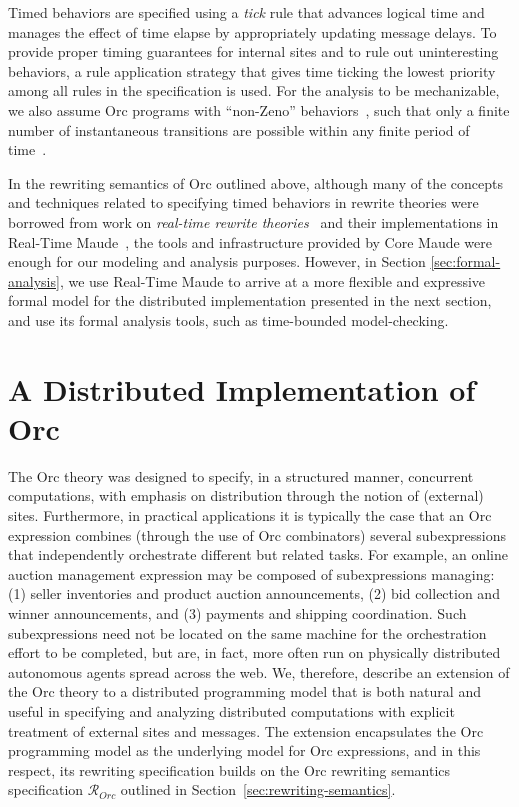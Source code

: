 \documentclass{eptcs}
\begin{document}
Timed behaviors are specified using a \emph{tick} rule that advances logical time and manages the effect of time elapse by appropriately updating message delays. To provide proper timing guarantees for internal sites and to rule out uninteresting behaviors, a rule application strategy that gives time ticking the lowest priority among all rules in the specification is used. For the analysis to be mechanizable, we also assume Orc programs with ``non-Zeno'' behaviors~\cite{OlveczkyM2007}, such that only a finite number of instantaneous transitions are possible within any finite  period of time~\cite{AlTurkiM07WWV}.
 


In the rewriting semantics of Orc outlined above, although many of the concepts and techniques related to specifying timed behaviors in rewrite theories were borrowed from work on \emph{real-time rewrite theories}~\cite{journ-rtm} and their implementations in Real-Time Maude~\cite{RTMManual07}, the tools and infrastructure provided by Core Maude were enough for our modeling and analysis purposes. However, in Section \ref{sec:formal-analysis}, we use Real-Time Maude to arrive at a more flexible and expressive formal model for the distributed implementation presented in the next section, and use its formal analysis tools, such as time-bounded model-checking.





\section{A Distributed Implementation of Orc} \label{sec:dist-orc}


The Orc theory was designed to specify, in a structured manner, concurrent computations, with emphasis on distribution through the notion of (external) sites. Furthermore, in practical applications it is typically the case that an Orc expression combines (through the use of Orc combinators) several subexpressions that independently orchestrate different but related tasks. For example, an online auction management expression may be composed of subexpressions managing: (1) seller inventories and product auction announcements, (2) bid collection and winner announcements, and (3) payments and shipping coordination. Such subexpressions need not be located on the same machine for the orchestration effort to be completed, but are, in fact, more often run on physically distributed autonomous agents spread across the web. We, therefore, describe an extension of the Orc theory to a distributed programming model that is both natural and useful in specifying and analyzing distributed computations with explicit treatment of external sites and messages. The extension encapsulates the Orc programming model as the underlying model for Orc expressions, and in this respect, its rewriting specification builds on the Orc rewriting semantics specification $\mathcal{R}_{Orc}$ outlined in Section~\ref{sec:rewriting-semantics}. 
\end{document}
